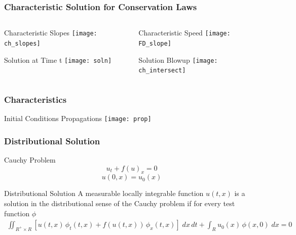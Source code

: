 \documentclass{beamer}
\begin{document}
\begin{frame}
\frametitle{Characteristic Solution for Conservation Laws}
\begin{columns}
\begin{column}[c]{5cm}
\begin{beamerboxesrounded}[upper=uppercol,lower=lowercol,shadow=true]{Characteristic Slopes}
\texttt{[image: ch\_slopes]}
\end{beamerboxesrounded}
\begin{beamerboxesrounded}[upper=uppercol,lower=lowercol,shadow=true]{Solution at Time t}
\texttt{[image: soln]}
\end{beamerboxesrounded}
\end{column}
\begin{column}[c]{5cm}
\begin{beamerboxesrounded}[upper=uppercol,lower=lowercol,shadow=true]{Characteristic Speed}
\texttt{[image: FD\_slope]}
\end{beamerboxesrounded}
\begin{beamerboxesrounded}[upper=uppercol,lower=lowercol,shadow=true]{Solution Blowup}
\texttt{[image: ch\_intersect]}
\end{beamerboxesrounded}
\end{column}
\end{columns}
\end{frame}
\begin{frame}
\frametitle{Characteristics}
\begin{beamerboxesrounded}[upper=uppercol,lower=lowercol,shadow=true,width=6cm]{Initial Conditions Propagations}
\texttt{[image: prop]}
\end{beamerboxesrounded}
\end{frame}
\begin{frame}
\frametitle{Distributional Solution}
\begin{block}{Cauchy Problem}
$$
u_t + f(u)_x = 0 
$$
$$
u(0,x)=u_0(x)
$$
\end{block}
\begin{alertblock}{Distributional Solution}
A measurable locally integrable function $u(t,x)$ is a solution in the distributional sense of the Cauchy problem if for every test function $\phi$
\begin{eqnarray}
\iint_{R^+ \times R}[u(t,x)\,\phi_{t}(t,x) + f(u(t,x))\,\phi_{x}(t,x)]\;dx\,dt + \int_{R} u_{0}(x)\,\phi(x,0)\;dx=0 \nonumber
\end{eqnarray}
\end{alertblock}
\end{frame}
\end{document}
